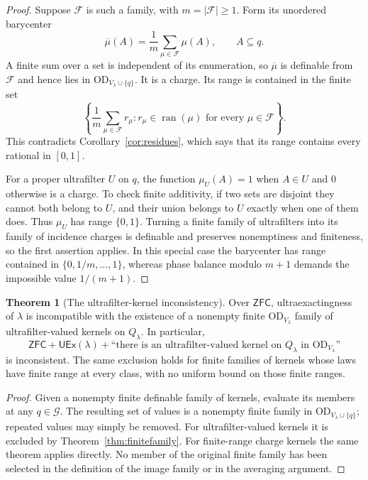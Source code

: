 \documentclass[11pt,letterpaper]{article}
\theoremstyle{definition}
\newtheorem{theorem}[definition]{Theorem}
\newcommand{\ZFC}{\mathsf{ZFC}}
\newcommand{\OD}{\mathrm{OD}}
\newcommand{\UEx}{\mathsf{UEx}}
\newcommand{\ran}{\operatorname{ran}}
\newcommand{\ODlam}{\OD_{V_\lambda}}
\newcommand{\ODq}{\OD_{V_\lambda\cup\{q\}}}
\newcommand{\Qlam}{Q_\lambda}
\begin{document}
\begin{proof}
Suppose $\mathcal F$ is such a family, with $m=|\mathcal F|\ge1$. Form its unordered barycenter
\[
 \overline\mu(A)=\frac1m\sum_{\mu\in\mathcal F}\mu(A),\qquad A\subseteq q.
\]
A finite sum over a set is independent of its enumeration, so $\overline\mu$ is definable from $\mathcal F$ and hence lies in $\ODq$. It is a charge. Its range is contained in the finite set
\[
 \left\{\frac1m\sum_{\mu\in\mathcal F}r_\mu:
             r_\mu\in\ran(\mu)\text{ for every }\mu\in\mathcal F\right\}.
\]
This contradicts Corollary~\ref{cor:residues}, which says that its range contains every rational in $[0,1]$.

For a proper ultrafilter $U$ on $q$, the function $\mu_U(A)=1$ when $A\in U$ and $0$ otherwise is a charge. To check finite additivity, if two sets are disjoint they cannot both belong to $U$, and their union belongs to $U$ exactly when one of them does. Thus $\mu_U$ has range $\{0,1\}$. Turning a finite family of ultrafilters into its family of incidence charges is definable and preserves nonemptiness and finiteness, so the first assertion applies. In this special case the barycenter has range contained in $\{0,1/m,\ldots,1\}$, whereas phase balance modulo $m+1$ demands the impossible value $1/(m+1)$.
\end{proof}

\begin{theorem}[The ultrafilter-kernel inconsistency]\label{thm:ufkernel}
Over $\ZFC$, ultraexactingness of $\lambda$ is incompatible with the existence of a nonempty finite $\ODlam$ family of ultrafilter-valued kernels on $\Qlam$. In particular,
\begin{equation}\label{eq:inconsistent}
 \ZFC+\UEx(\lambda)
 +\text{``there is an ultrafilter-valued kernel on $\Qlam$ in $\ODlam$''}
\end{equation}
is inconsistent. The same exclusion holds for finite families of kernels whose laws have finite range at every class, with no uniform bound on those finite ranges.
\end{theorem}

\begin{proof}
Given a nonempty finite definable family of kernels, evaluate its members at any $q\in\mathcal G$. The resulting set of values is a nonempty finite family in $\ODq$; repeated values may simply be removed. For ultrafilter-valued kernels it is excluded by Theorem~\ref{thm:finitefamily}. For finite-range charge kernels the same theorem applies directly. No member of the original finite family has been selected in the definition of the image family or in the averaging argument.
\end{proof}
\end{document}
